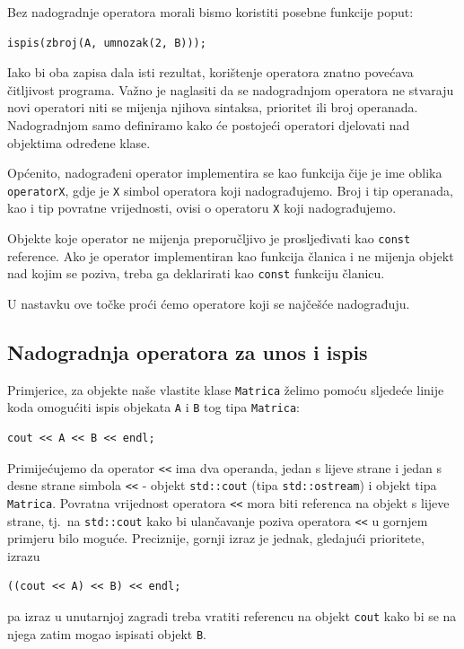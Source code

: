Bez nadogradnje operatora morali bismo koristiti posebne funkcije poput:
\begin{verbatim}
ispis(zbroj(A, umnozak(2, B)));
\end{verbatim}

Iako bi oba zapisa dala isti rezultat, korištenje operatora znatno povećava čitljivost programa.
Važno je naglasiti da se nadogradnjom operatora ne stvaraju novi operatori niti se mijenja njihova sintaksa, prioritet ili broj operanada. 
Nadogradnjom samo definiramo kako će postojeći operatori djelovati nad objektima određene klase.
\medskip

Općenito, nadograđeni operator implementira se kao funkcija čije je ime oblika \texttt{operatorX}, 
gdje je \texttt{X} simbol operatora koji nadograđujemo.
Broj i tip operanada, kao i tip povratne vrijednosti,
ovisi o operatoru \texttt{X} koji nadograđujemo.

\begin{savjet}
    Objekte koje operator ne mijenja preporučljivo je prosljeđivati kao \texttt{const} reference. 
    Ako je operator implementiran kao funkcija članica i ne mijenja objekt nad kojim se poziva, treba ga deklarirati kao \texttt{const} funkciju članicu.
\end{savjet}

U nastavku ove točke proći ćemo operatore koji se najčešće nadograđuju.

\subsection{Nadogradnja operatora za unos i ispis}


Primjerice, za objekte naše vlastite klase \texttt{Matrica}
želimo pomoću sljedeće linije koda omogućiti ispis objekata \texttt{A} i \texttt{B}
tog tipa \texttt{Matrica}:

\begin{verbatim}
cout << A << B << endl;
\end{verbatim}

Primijećujemo da operator \texttt{<\!<} ima dva operanda,
jedan s lijeve strane i jedan s desne strane simbola \texttt{<\!<} - 
objekt \texttt{std::cout} (tipa \texttt{std::ostream})
i objekt tipa \texttt{Matrica}.
Povratna vrijednost operatora \texttt{<\!<} mora biti referenca na objekt s lijeve strane, 
tj.\ na \texttt{std::cout} kako bi ulančavanje
poziva operatora \texttt{<\!<} u gornjem primjeru
bilo moguće.
Preciznije, gornji izraz je jednak, gledajući prioritete,
izrazu 
\begin{verbatim}
((cout << A) << B) << endl;
\end{verbatim}
pa izraz u unutarnjoj zagradi treba vratiti referencu na 
objekt \texttt{cout} kako bi se na njega zatim
mogao ispisati objekt \texttt{B}.
\medskip


